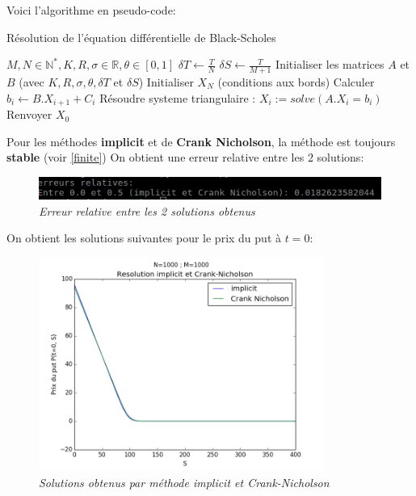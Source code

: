\documentclass[10pt]{article}
\begin{document}
  Voici l'algorithme en pseudo-code:
  \begin{algorithm}
    \caption{Résolution de l'équation différentielle de Black-Scholes}
    \begin{algorithmic}
      \REQUIRE $M, N \in \mathbb{N^*} , K, R, \sigma \in \mathbb{R}, \theta \in [0, 1]$
      \STATE $\delta T \leftarrow \frac{T}{N}$
      \STATE $\delta S \leftarrow \frac{T}{M + 1}$
      \STATE Initialiser les matrices $A$ et $B$ (avec $K, R, \sigma, \theta, \delta T$ et $\delta S$)
      \STATE Initialiser $X_N$ (conditions aux bords)
	\STATE Calculer $b_i \leftarrow B.X_{i + 1} + C_{i}$
	\STATE Résoudre systeme triangulaire : $X_i := solve(A . X_i = b_i)$
      \ENDFOR
      \STATE Renvoyer $X_0$
    \end{algorithmic}
  \end{algorithm}

  
  \newpage
  Pour les méthodes \textbf{implicit} et de \textbf{Crank Nicholson}, la méthode est toujours \textbf{stable} (voir \ref{finite})
  On obtient une erreur relative entre les 2 solutions:
  \begin{figure}[H]
    \begin{center}
      \includegraphics[width=12cm,keepaspectratio]{./images/erreur_implicit_crank-nicholson_1000_1000.png}
    \end{center}
    \caption{\textit{Erreur relative entre les 2 solutions obtenus}}
    \label{erreur_1000_1000}
  \end{figure}
  
  On obtient les solutions suivantes pour le prix du put à $t=0$:
  \begin{figure}[H]
    \begin{center}
      \includegraphics[height=7cm,keepaspectratio]{./images/implicit_crank-nicholson_1000_1000.png}
    \end{center}
    \caption{\textit{Solutions obtenus par méthode implicit et Crank-Nicholson}}
    \label{implicit_crank-nicholson_1000_1000}
  \end{figure}
  
\end{document}
